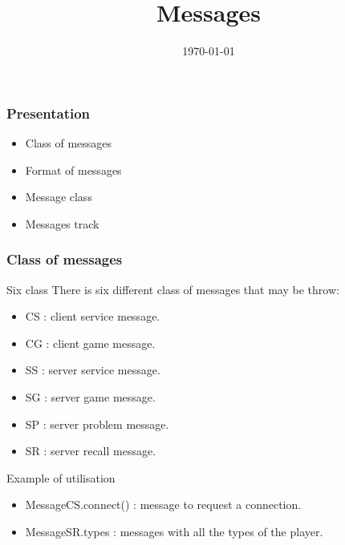 \documentclass[9pt]{beamer}
\title{Messages}
\institute{University of Orléans}
\date{\today}
\begin{document}
\begin{frame}
	\titlepage
\end{frame}

\begin{frame}
	\frametitle{Presentation}
	\begin{center} 
		\begin{itemize}
			\item Class of messages
			\item Format of messages
			\item Message class
			\item Messages track
		 \end{itemize}
	 \end{center}
\end{frame}

\begin{frame}
	\frametitle{Class of messages}
	\begin{block}{Six class}
		There is six different class of messages that may be throw:
		\begin{itemize}
			\item<2-> CS : client service message.
			\item<3-> CG : client game message.
			\item<4-> SS : server service message.
			\item<5-> SG : server game message.
			\item<6-> SP : server problem message.
			\item<7-> SR : server recall message.
		\end{itemize}
	\end{block}
	\begin{block}{Example of utilisation}
		\begin{itemize}
			\item<7-> MessageCS.connect() : message to request a connection.
			\item<8-> MessageSR.types : messages with all the types of the player.
		\end{itemize}
	\end{block}
	\transdissolve
\end{frame}
\end{document}
